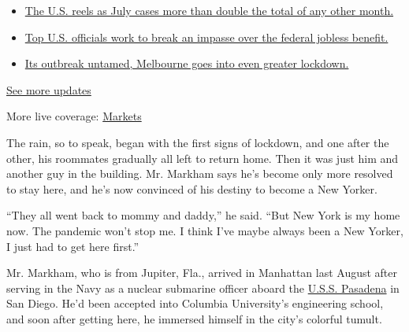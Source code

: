 \begin{itemize}
\tightlist
\item
  \href{https://www.nytimes3xbfgragh.onion/2020/08/01/world/coronavirus-covid-19.html?action=click\&pgtype=Article\&state=default\&region=MAIN_CONTENT_1\&context=storylines_live_updates\#link-34047410}{The
  U.S. reels as July cases more than double the total of any other
  month.}
\item
  \href{https://www.nytimes3xbfgragh.onion/2020/08/01/world/coronavirus-covid-19.html?action=click\&pgtype=Article\&state=default\&region=MAIN_CONTENT_1\&context=storylines_live_updates\#link-780ec966}{Top
  U.S. officials work to break an impasse over the federal jobless
  benefit.}
\item
  \href{https://www.nytimes3xbfgragh.onion/2020/08/01/world/coronavirus-covid-19.html?action=click\&pgtype=Article\&state=default\&region=MAIN_CONTENT_1\&context=storylines_live_updates\#link-2bc8948}{Its
  outbreak untamed, Melbourne goes into even greater lockdown.}
\end{itemize}

\href{https://www.nytimes3xbfgragh.onion/2020/08/01/world/coronavirus-covid-19.html?action=click\&pgtype=Article\&state=default\&region=MAIN_CONTENT_1\&context=storylines_live_updates}{See
more updates}

More live coverage:
\href{https://www.nytimes3xbfgragh.onion/live/2020/07/31/business/stock-market-today-coronavirus?action=click\&pgtype=Article\&state=default\&region=MAIN_CONTENT_1\&context=storylines_live_updates}{Markets}

The rain, so to speak, began with the first signs of lockdown, and one
after the other, his roommates gradually all left to return home. Then
it was just him and another guy in the building. Mr. Markham says he's
become only more resolved to stay here, and he's now convinced of his
destiny to become a New Yorker.

``They all went back to mommy and daddy,'' he said. ``But New York is my
home now. The pandemic won't stop me. I think I've maybe always been a
New Yorker, I just had to get here first.''

Mr. Markham, who is from Jupiter, Fla., arrived in Manhattan last August
after serving in the Navy as a nuclear submarine officer aboard the
\href{https://www.csp.navy.mil/pasadena/About/}{U.S.S. Pasadena} in San
Diego. He'd been accepted into Columbia University's engineering school,
and soon after getting here, he immersed himself in the city's colorful
tumult.


